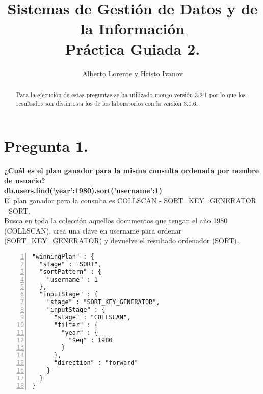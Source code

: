 \documentclass{article}
\begin{document}
\title{Sistemas de Gestión de Datos y de la Información\\Práctica Guiada 2.}
\author{Alberto Lorente y Hristo Ivanov}
\maketitle
  \begin{abstract}
     Para la ejecución de estas preguntas se ha utilizado mongo versión 3.2.1 por lo que los resultados son distintos a los de los laboratorios
     con la versión 3.0.6.
  \end{abstract}
  \newpage
  \section{Pregunta 1.}
  \textbf{¿Cuál es el plan ganador para la misma consulta ordenada por nombre de usuario? \\ db.users.find({'year':1980}).sort({'username':1}) \\}
    El plan ganador para la consulta es COLLSCAN - SORT\_KEY\_GENERATOR - SORT. \\
    Busca en toda la colección aquellos documentos que tengan el año 1980 (COLLSCAN), crea una clave en username para ordenar (SORT\_KEY\_GENERATOR)
    y devuelve el resultado ordenador (SORT).
    \begin{lstlisting}[numbers=left,frame=single]
"winningPlan" : {
  "stage" : "SORT",
  "sortPattern" : {
    "username" : 1
  },
  "inputStage" : {
    "stage" : "SORT_KEY_GENERATOR",
    "inputStage" : {
      "stage" : "COLLSCAN",
      "filter" : {
        "year" : {
          "$eq" : 1980
        }
      },
      "direction" : "forward"
    }
  }
}
    \end{lstlisting}


  \newpage
\end{document}
